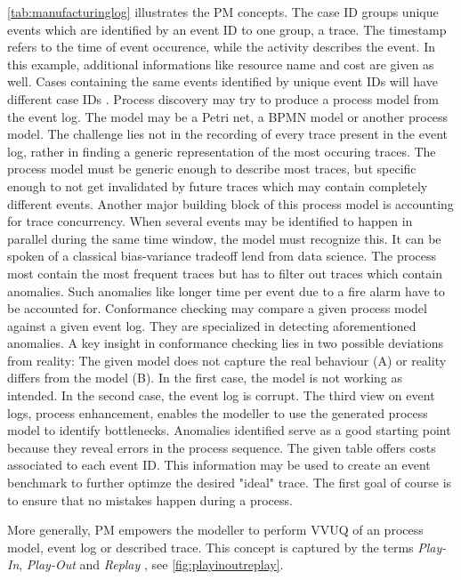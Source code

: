\autoref{tab:manufacturinglog} illustrates the PM concepts. The case ID groups unique events which are identified by an event ID to one group, a trace. The timestamp refers to the time of event occurence, while the activity describes the event. In this example, additional informations like resource name and cost are given as well. Cases containing the same events identified by unique event IDs will have different case IDs \autocite{van2016data}. Process discovery may try to produce a process model from the event log. The model may be a Petri net, a BPMN model or another process model. The challenge lies not in the recording of every trace present in the event log, rather in finding a generic representation of the most occuring traces. The process model must be generic enough to describe most traces, but specific enough to not get invalidated by future traces which may contain completely different events. Another major building block of this process model is accounting for trace concurrency. When several events may be identified to happen in parallel during the same time window, the model must recognize this. It can be spoken of a classical bias-variance tradeoff lend from data science. The process most contain the most frequent traces but has to filter out traces which contain anomalies. Such anomalies like longer time per event due to a fire alarm have to be accounted for. Conformance checking may compare a given process model against a given event log. They are specialized in detecting aforementioned anomalies. A key insight in conformance checking lies in two possible deviations from reality: The given model does not capture the real behaviour (A) or reality differs from the model (B). In the first case, the model is not working as intended. In the second case, the event log is corrupt. The third view on event logs, process enhancement, enables the modeller to use the generated process model to identify bottlenecks. Anomalies identified serve as a good starting point because they reveal errors in the process sequence. The given table offers costs associated to each event ID. This information may be used to create an event benchmark to further optimze the desired "ideal" trace. The first goal of course is to ensure that no mistakes happen during a process.

More generally, PM empowers the modeller to perform VVUQ of an process model, event log or described trace. This concept is captured by the terms \textit{Play-In}, \textit{Play-Out} and \textit{Replay} \autocite{damm2001lscs}, see \autoref{fig:playinoutreplay}.

